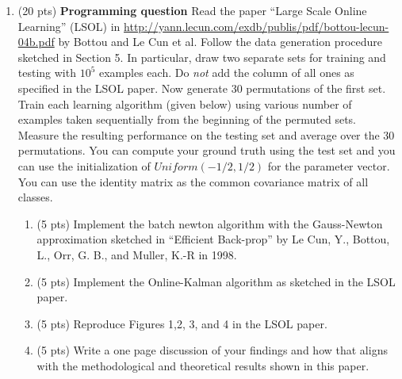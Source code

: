 \documentclass[11pt]{article}
\newcommand{\bi}{\begin{enumerate}}
\newcommand{\ib}{\end{enumerate}}
\newcommand{\p}{\item}
\begin{document}
\begin{enumerate}
\item (20 pts) \textbf{Programming question} Read the paper ``Large Scale Online Learning'' (LSOL) in \url{http://yann.lecun.com/exdb/publis/pdf/bottou-lecun-04b.pdf} by Bottou and Le Cun et al. Follow the data generation procedure sketched in Section 5. In particular, draw two separate sets for training and testing with $10^5$ examples each. Do \textit{not} add the column of all ones as specified in the LSOL paper. Now generate 30 permutations of the first set. Train each learning algorithm (given below)  using various number of examples taken sequentially from the beginning of the permuted sets. Measure the resulting performance  on the testing set and average over the 30 permutations. You can compute your ground truth using the test set and you can use the initialization of $Uniform(-1/2,1/2)$ for the parameter vector. You can use the identity matrix as the common  covariance matrix of all classes.
\bi
\p (5 pts) Implement the batch newton algorithm  with the Gauss-Newton approximation sketched in ``Efficient Back-prop'' by Le Cun, Y., Bottou, L., Orr, G. B., and Muller, K.-R in 1998.
\p (5 pts) Implement the Online-Kalman algorithm as sketched in the LSOL paper.
\p (5 pts) Reproduce Figures 1,2, 3, and 4 in the LSOL paper. 
\p (5 pts) Write a one page discussion of your findings and how that aligns with the methodological and theoretical results shown in this paper.
\ib
\end{enumerate}
\end{document}
